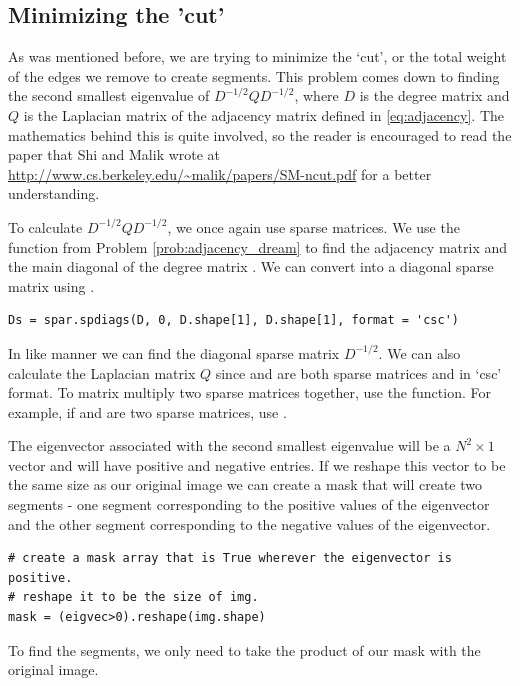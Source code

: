 \subsection*{Minimizing the 'cut'}

As was mentioned before, we are trying to minimize the `cut', or the total weight of the edges we remove to create segments. This problem comes down to finding the second smallest eigenvalue of $D^{-1/2}QD^{-1/2}$, where $D$ is the degree matrix and $Q$ is the Laplacian matrix of the adjacency matrix defined in \eqref{eq:adjacency}. The mathematics behind this is quite involved, so the reader is encouraged to read the paper that Shi and Malik wrote at \url{http://www.cs.berkeley.edu/~malik/papers/SM-ncut.pdf} for a better understanding.
	
To calculate $D^{-1/2}QD^{-1/2}$, we once again use sparse matrices. We use the  function from Problem \ref{prob:adjacency_dream} to find the adjacency matrix  and the main diagonal of the degree matrix . We can convert  into a diagonal sparse matrix using .

\begin{lstlisting}
Ds = spar.spdiags(D, 0, D.shape[1], D.shape[1], format = 'csc')
\end{lstlisting}

In like manner we can find the diagonal sparse matrix $D^{-1/2}$. We can also calculate the Laplacian matrix $Q$ since  and  are both sparse matrices and in `csc' format. To matrix multiply two sparse matrices together, use the  function. For example, if  and  are two sparse matrices, use .

The eigenvector associated with the second smallest eigenvalue will be a $N^2 \times 1$ vector and will have positive and negative entries. If we reshape this vector to be the same size as our original image we can create a mask that will create two segments - one segment corresponding to the positive values of the eigenvector and the other segment corresponding to the negative values of the eigenvector. 

\begin{lstlisting}
# create a mask array that is True wherever the eigenvector is positive.
# reshape it to be the size of img.
mask = (eigvec>0).reshape(img.shape)
\end{lstlisting}
To find the segments, we only need to take the product of our mask with the original image.

